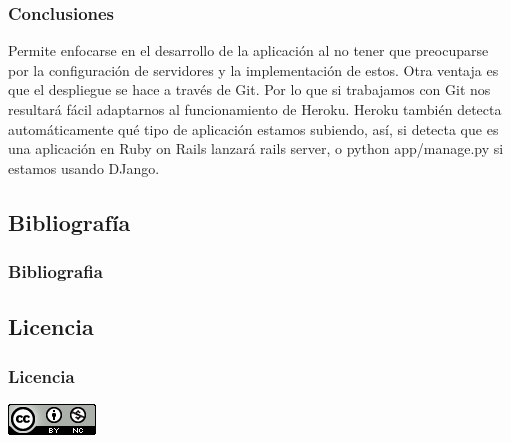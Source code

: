 \documentclass{beamer}
\begin{document}
\begin{frame}
\frametitle{Conclusiones}
Permite enfocarse en el desarrollo de la aplicación al no tener que preocuparse por la configuración de servidores y la implementación de estos. Otra ventaja es que el despliegue se hace a través de Git. Por lo que si trabajamos con Git nos resultará fácil adaptarnos al funcionamiento de Heroku. Heroku también detecta automáticamente qué tipo de aplicación estamos subiendo, así, si detecta que es una aplicación en Ruby on Rails lanzará rails server, o python app/manage.py si estamos usando DJango.
\end{frame}


\subsection{Bibliografía}
\begin{frame}
\frametitle{Bibliografia}


\end{frame}

\subsection{Licencia}
\begin{frame}
\frametitle{Licencia}
\begin{center}
\href{http://creativecommons.org/licenses/by-nc/4.0/}{\includegraphics[scale=.8]{cc}}
\end{center}
\end{frame}

\MuchasGraciasFrame
\end{document}
